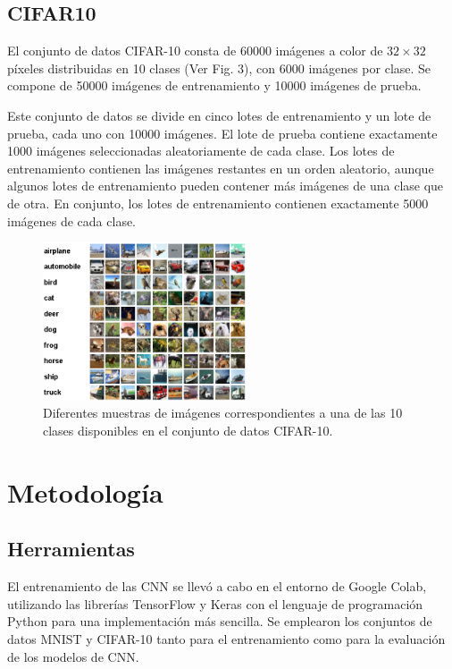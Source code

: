\documentclass[journal]{IEEEtai}
\begin{document}
\subsection{CIFAR10}

El conjunto de datos CIFAR-10 consta de 60000 imágenes a color de $32 \times 32$ píxeles distribuidas en 10 clases (Ver Fig. 3), con 6000 imágenes por clase. Se compone de 50000 imágenes de entrenamiento y 10000 imágenes de prueba.

Este conjunto de datos se divide en cinco lotes de entrenamiento y un lote de prueba, cada uno con 10000 imágenes. El lote de prueba contiene exactamente 1000 imágenes seleccionadas aleatoriamente de cada clase. Los lotes de entrenamiento contienen las imágenes restantes en un orden aleatorio, aunque algunos lotes de entrenamiento pueden contener más imágenes de una clase que de otra. En conjunto, los lotes de entrenamiento contienen exactamente 5000 imágenes de cada clase.

\begin{figure}[H]
\centering
\includegraphics[width=6cm]{img/CIFAR10.png}
\caption{Diferentes muestras de imágenes correspondientes a una de las 10 clases disponibles en el conjunto de datos CIFAR-10.}
\label{fig}
\end{figure}

\section{Metodología}

\subsection{Herramientas}

El entrenamiento de las CNN se llevó a cabo en el entorno de Google Colab, utilizando las librerías TensorFlow y Keras con el lenguaje de programación Python para una implementación más sencilla. Se emplearon los conjuntos de datos MNIST y CIFAR-10 tanto para el entrenamiento como para la evaluación de los modelos de CNN.
\end{document}
